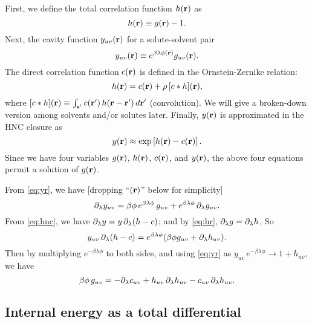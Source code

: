 \documentclass[12pt]{article}
\begin{document}
First,
we define the total correlation function $h(\mathbf{r})$ as
\begin{equation}
  h(\mathbf{r}) \equiv g(\mathbf{r}) - 1.
  \label{eq:hr}
\end{equation}
%
%
%
Next, the cavity function $y_{uv}(\mathbf{r})$ for a solute-solvent pair
\begin{equation}
  y_{uv}(\mathbf{r}) \equiv e^{ \beta \lambda \phi(\mathbf{r}) } g_{uv}(\mathbf{r}).
  \label{eq:yr}
\end{equation}
%
%
%
The direct correlation function $c(\mathbf{r})$
is defined in the Ornstein-Zernike relation:
\begin{equation}
  h(\mathbf{r}) = c(\mathbf{r}) + \rho \, [c * h](\mathbf{r}),
  \label{eq:cr}
\end{equation}
where $[c*h](\mathbf{r}) \equiv \int_{\mathbf{s}'} c(\mathbf{r}') \, h(\mathbf{r} - \mathbf{r}') \, d\mathbf{r}'$
  (convolution).
We will give a broken-down version among solvents and/or solutes later.
%
%
%
%
%
%
Finally, $y(\mathbf{r})$ is approximated in the HNC closure as
\begin{equation}
  y(\mathbf{r}) \approx \exp\left[ h(\mathbf{r}) - c(\mathbf{r}) \right].
  \label{eq:hnc}
\end{equation}
Since we have four variables
  $g(\mathbf{r})$, $h(\mathbf{r})$, $c(\mathbf{r})$, and $y(\mathbf{r})$,
the above four equations permit a solution of $g(\mathbf{r})$.



From \eqref{eq:yr}, we have [dropping ``$(\mathbf{r})$'' below for simplicity]
\[
  \partial_\lambda y_{uv}
  =
  \beta \phi \, e^{ \beta \lambda \phi } \, g_{uv}
    +
    e^{ \beta \lambda \phi } \, \partial_\lambda g_{uv}.
\]
From \eqref{eq:hnc}, we have $\partial_\lambda y = y \, \partial_\lambda (h - c)$;
and by \eqref{eq:hr}, $\partial_\lambda g = \partial_\lambda h$, So
\[
  y_{uv} \, \partial_\lambda (h - c) = e^{\beta \lambda \phi }
  ( \beta \phi g_{uv} + \partial_\lambda h_{uv} ).
\]
Then by multiplying $e^{-\beta \lambda \phi}$ to both sides,
and using
\eqref{eq:yr}
as $y_{uv} \, e^{-\beta \lambda \phi} \rightarrow 1 + h_{uv}$,
we have
\begin{equation}
  \beta \phi \, g_{uv}
  =
  - \partial_\lambda c_{uv} + h_{uv} \, \partial_\lambda h_{uv} - c_{uv} \, \partial_\lambda h_{uv}.
  \label{eq:hc1}
\end{equation}



\subsection{Internal energy as a total differential}
\end{document}
